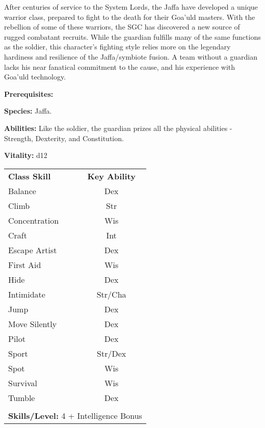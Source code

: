 \begin{multicols}{2}

After centuries of service to the System Lords, the Jaffa have developed a unique warrior class, prepared to fight to the death for their Goa'uld masters. With the rebellion of some of these warriors, the SGC has discovered a new source of rugged combatant recruits. While the guardian fulfills many of the same functions as the soldier, this character's fighting style relies more on the legendary hardiness and resilience of the Jaffa/symbiote fusion. A team without a guardian lacks his near fanatical commitment to the cause, and his experience with Goa'uld technology.

\columnbreak

\textbf{Prerequisites:} 
\begin{description*}
\item[\hspace{1.5cm}\textbf{Species:}] Jaffa.
\end{description*}

\textbf{Abilities:} Like the soldier, the guardian prizes all the physical abilities - Strength, Dexterity, and Constitution.

\textbf{Vitality:} d12

\end{multicols}

\begin{table}[htb]
\raggedright
\begin{tabular}{l c}
\textbf{Class Skill} & \textbf{Key Ability}\\

Balance & Dex\\
Climb & Str\\
Concentration & Wis\\
Craft & Int\\
Escape Artist & Dex\\
First Aid & Wis\\
Hide & Dex\\
Intimidate & Str/Cha\\
Jump & Dex\\
Move Silently & Dex\\
Pilot & Dex\\
Sport & Str/Dex\\
Spot & Wis\\
Survival & Wis\\
Tumble & Dex\\

\multicolumn{2}{l}{\cellcolor{white}}\\
\multicolumn{2}{l}{\cellcolor{white}\textbf{Skills/Level:} 4 + Intelligence Bonus}\\
\end{tabular}
\end{table}

